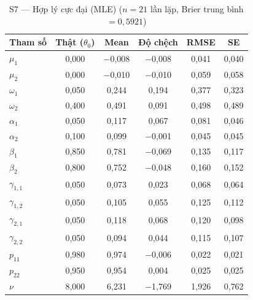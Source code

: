 \documentclass[11pt,a4paper]{article}
\begin{document}
\begin{table}[H]\centering\scriptsize
\caption{S7 --- Hợp lý cực đại (MLE) ($n=21$ lần lặp, Brier trung bình $=0{,}5921$)}
\begin{tabularx}{\textwidth}{l C C C C C}
\toprule
\textbf{Tham số} & \textbf{Thật ($\theta_0$)} & \textbf{Mean} & \textbf{Độ chệch} & \textbf{RMSE} & \textbf{SE} \\
\midrule
$\mu_1$ & 0{,}000 & $-$0{,}008 & $-$0{,}008 & 0{,}041 & 0{,}040 \\
$\mu_2$ & 0{,}000 & $-$0{,}010 & $-$0{,}010 & 0{,}059 & 0{,}058 \\
$\omega_1$ & 0{,}050 & 0{,}244 & 0{,}194 & 0{,}377 & 0{,}323 \\
$\omega_2$ & 0{,}400 & 0{,}491 & 0{,}091 & 0{,}498 & 0{,}489 \\
$\alpha_1$ & 0{,}050 & 0{,}117 & 0{,}067 & 0{,}081 & 0{,}046 \\
$\alpha_2$ & 0{,}100 & 0{,}099 & $-$0{,}001 & 0{,}045 & 0{,}045 \\
$\beta_1$ & 0{,}850 & 0{,}781 & $-$0{,}069 & 0{,}135 & 0{,}117 \\
$\beta_2$ & 0{,}800 & 0{,}752 & $-$0{,}048 & 0{,}160 & 0{,}152 \\
$\gamma_{1,1}$ & 0{,}050 & 0{,}073 & 0{,}023 & 0{,}068 & 0{,}064 \\
$\gamma_{1,2}$ & 0{,}050 & 0{,}105 & 0{,}055 & 0{,}125 & 0{,}112 \\
$\gamma_{2,1}$ & 0{,}050 & 0{,}118 & 0{,}068 & 0{,}120 & 0{,}098 \\
$\gamma_{2,2}$ & 0{,}050 & 0{,}094 & 0{,}044 & 0{,}115 & 0{,}107 \\
$p_{11}$ & 0{,}980 & 0{,}974 & $-$0{,}006 & 0{,}022 & 0{,}021 \\
$p_{22}$ & 0{,}950 & 0{,}954 & 0{,}004 & 0{,}025 & 0{,}025 \\
$\nu$ & 8{,}000 & 6{,}231 & $-$1{,}769 & 1{,}926 & 0{,}762 \\
\bottomrule
\end{tabularx}
\end{table}
\end{document}
